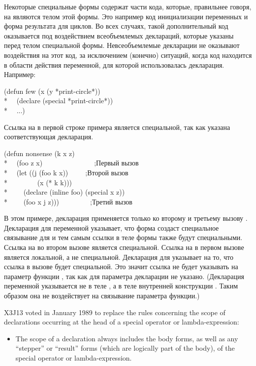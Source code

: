 \begin{defspec}
Некоторые специальные формы содержат части кода, которые, правильнее говоря, на
являются телом этой формы. Это например код инициализации переменных и форма
результата для циклов.
Во всех случаях, такой дополнительный код оказывается под воздействием
всеобъемлемых деклараций, которые указаны перед телом специальной формы.
Невсеобъемлемые декларации не оказывают воздействия на этот код, за исключением
(конечно) ситуаций, когда код находится в области действия переменной, для
которой использовалась декларация.
Например:
\begin{lisp}
(defun few (x  (y *print-circle*)) \\*
~~(declare (special *print-circle*)) \\*
~~...)
\end{lisp}
Ссылка на  в первой строке примера является специальной, так
как указана соответствующая декларация.
\begin{lisp}
(defun nonsense (k x z) \\*
~~(foo z x)~~~~~~~~~~~~~~~;\textrm{Первый вызов } \\*
~~(let ((j (foo k x))~~~~~;\textrm{Второй вызов } \\*
~~~~~~~~(x (* k k))) \\*
~~~~(declare (inline foo) (special x z)) \\*
~~~~(foo x j z)))~~~~~~~~~;\textrm{Третий вызов }
\end{lisp}
В этом примере, декларация  применяется только ко второму и третьему вызову
.
Декларация  для переменной  указывает, что форма 
создаст специальное связывание для  и тем самым ссылки в теле формы также
будут специальными.
Ссылка на  во втором вызове  является специальной.
Ссылка на  в первом вызове  является локальной, а не специальной.
Декларация  для  указывает на то, что ссылка в вызове
 будет специальной. Это значит ссылка не будет указывать на параметр
функции , так как для параметра декларации  не
указано.
(Декларация  переменной  указывается не в теле , а
в теле внутренней конструкции . Таким образом она не воздействует на
связывание параметра функции.)
\begin{new}
X3J13 voted in January 1989
to replace the rules concerning the scope of
declarations occurring at the head of a special operator or lambda-expression:
\begin{itemize}
\item The scope of a declaration always includes the body forms, as well as any
``stepper'' or ``result'' forms (which are logically part of the body), of the
special operator or lambda-expression.


\end{itemize}
\end{new}
\end{defspec}
